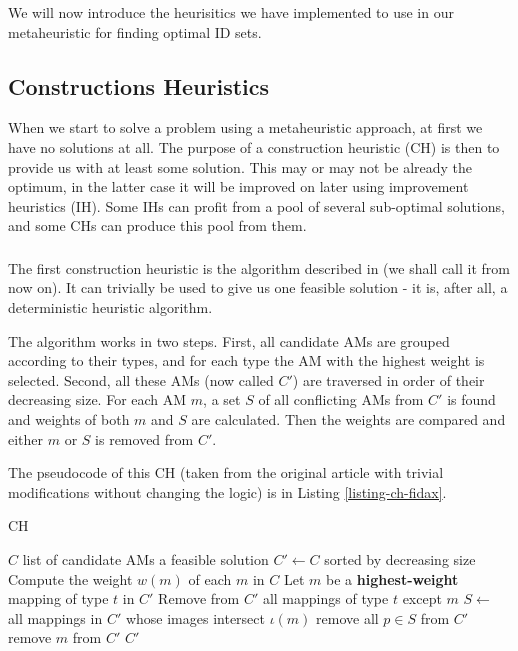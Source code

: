 We will now introduce the heurisitics we have implemented to use in our metaheuristic for finding optimal ID sets.

\subsection{Constructions Heuristics}
\label{section-mip-chs}

When we start to solve a problem using a metaheuristic approach, at first we have no solutions at all. The purpose of a construction heuristic (CH) is then to provide us with at least some solution. This may or may not be already the optimum, in the latter case it will be improved on later using improvement heuristics (IH). Some IHs can profit from a pool of several sub-optimal solutions, and some CHs can produce this pool from them.

\subsubsection{}
\label{section-mip-fidax}

The first construction heuristic is the algorithm described in \cite{fidax} (we shall call it  from now on). It can trivially be used to give us one feasible solution - it is, after all, a deterministic heuristic algorithm.

The algorithm works in two steps. First, all candidate AMs are grouped according to their types, and for each type the AM with the highest weight is selected. Second, all these AMs (now called $C'$) are traversed in order of their decreasing size. For each AM $m$, a set $S$ of all conflicting AMs from $C'$ is found and weights of both $m$ and $S$ are calculated. Then the weights are compared and either $m$ or $S$ is removed from $C'$.

The pseudocode of this CH (taken from the original article with trivial modifications without changing the logic) is in Listing \ref{listing-ch-fidax}.

\begin{algorithm}
\caption{ CH}
\label{listing-ch-fidax}
\begin{algorithmic}
\REQUIRE $C$ list of candidate AMs
\ENSURE a feasible solution
\STATE $C' \gets C$ sorted by decreasing size
\STATE Compute the weight $w(m)$ of each $m$ in $C$
  \STATE Let $m$ be a \textbf{highest-weight} mapping of type $t$ in $C'$
  \STATE Remove from $C'$ all mappings of type $t$ except $m$
\ENDFOR
{}
  \STATE $S \gets$ all mappings in $C'$ whose images intersect $\iota(m)$
    \STATE remove all $p \in S$ from $C'$
  \ELSE
    \STATE remove $m$ from $C'$
  \ENDIF
\ENDFOR
\RETURN $C'$
\end{algorithmic}
\end{algorithm}

